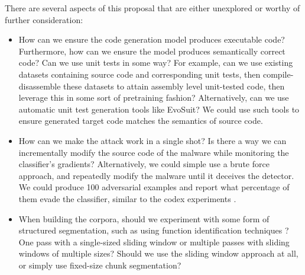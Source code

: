 \documentclass[conference]{IEEEtran}
\begin{document}
There are several aspects of this proposal that are either unexplored or worthy of further consideration:
\begin{itemize}
	\item How can we ensure the code generation model produces executable code? Furthermore, how can we ensure the model produces semantically correct code? Can we use unit tests in some way? For example, can we use existing datasets containing source code and corresponding unit tests, then compile-disassemble these datasets to attain assembly level unit-tested code, then leverage this in some sort of pretraining fashion? Alternatively, can we use automatic unit test generation tools like EvoSuit? We could use such tools to ensure generated target code matches the semantics of source code. 
	\item How can we make the attack work in a single shot? Is there a way we can incrementally modify the source code of the malware while monitoring the classifier's gradients? Alternatively, we could simple use a brute force approach, and repeatedly modify the malware until it deceives the detector. We could produce 100 adversarial examples and report what percentage of them evade the classifier, similar to the codex experiments \cite{chen2021evaluating}.
	\item When building the corpora, should we experiment with some form of structured segmentation, such as using function identification techniques \cite{shin2015recognizing}? One pass with a single-sized sliding window or multiple passes with sliding windows of multiple sizes? Should we use the sliding window approach at all, or simply use fixed-size chunk segmentation?
\end{itemize}



\end{document}
